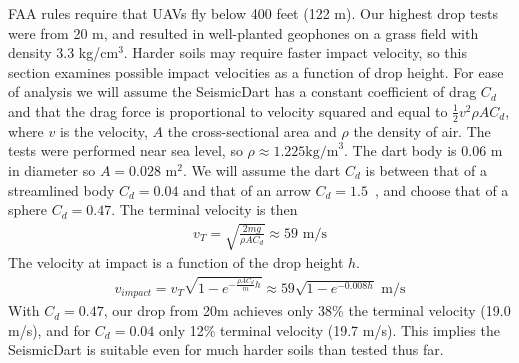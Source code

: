 FAA rules require that UAVs fly below 400 feet (122 m). Our highest drop tests were from 20 m, and resulted in well-planted geophones on a grass field with density 3.3 kg/cm$^3$. Harder soils may require faster impact velocity, so this section examines possible impact velocities as a function of drop height.
For ease of analysis we will assume the SeismicDart has a constant coefficient of drag $C_d$ and that the drag force is proportional to velocity squared and equal to $\frac{1}{2} v^2 \rho A C_d$, where $v$ is the velocity, $A$ the cross-sectional area and $\rho$ the density of air.  
 The tests were performed near sea level, so $\rho \approx 1.225  \text{kg/m}^3$.
  The dart body is 0.06 m in diameter so $A=0.028$ m$^2$.  We will assume the dart $C_d$ is between that of a streamlined body $C_d=0.04$ and that of an arrow $C_d=1.5$~\cite{miyazaki2013aerodynamic}, and choose that of a sphere $C_d=0.47$.
The terminal velocity is then
\begin{align}
v_T = \sqrt{\frac{2 m g}{\rho A  C_d}} \approx 59 \text{ m/s}
\end{align}
The velocity at impact is a function of the drop height $h$.
\begin{align}
v_{impact} = v_T  \sqrt{ 1 - e^{ -\frac{\rho A  C_d}{m} h }} \approx 59\sqrt{ 1 - e^{ -0.008 h }} \text{ m/s}
\end{align}
With  $C_d=0.47$, our drop from 20m achieves only 38\% the terminal velocity (19.0 m/s), and for $C_d=0.04$ only 12\% terminal velocity  (19.7 m/s).
This implies the SeismicDart is suitable even for much harder soils than tested thus far.






